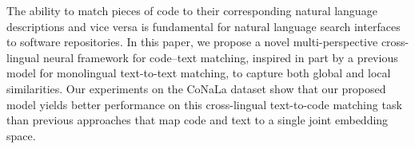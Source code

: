 The ability to match pieces of code to their corresponding natural language descriptions and vice versa is fundamental for natural language search interfaces to software repositories. In this paper, we propose a novel multi-perspective cross-lingual neural framework for code--text matching, inspired in part by a previous model for monolingual text-to-text matching, to capture both global and local similarities. Our experiments on the CoNaLa dataset show that our proposed model yields better performance on this cross-lingual text-to-code matching task than previous approaches that map code and text to a single joint embedding space.
